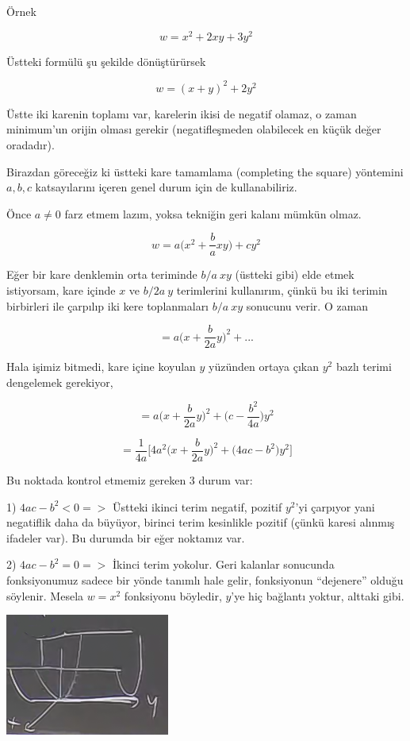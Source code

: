 \documentclass[12pt,fleqn]{article}\usepackage{../../common}
\begin{document}
Örnek

$$ w = x^2 + 2xy + 3y^2 $$

Üstteki formülü şu şekilde dönüştürürsek

$$ w = (x+y)^2 + 2y^2 $$

Üstte iki karenin toplamı var, karelerin ikisi de negatif olamaz, o zaman
minimum'un orijin olması gerekir (negatifleşmeden olabilecek en küçük değer
oradadır). 

Birazdan göreceğiz ki üstteki kare tamamlama (completing the square)
yöntemini $a,b,c$ katsayılarını içeren genel durum için de kullanabiliriz. 

Önce $a \ne 0$ farz etmem lazım, yoksa tekniğin geri kalanı mümkün olmaz. 

$$ w = a \bigg( x^2 + \frac{b}{a} xy \bigg) + cy^2 $$

Eğer bir kare denklemin orta teriminde $b/a \ xy$ (üstteki gibi) elde etmek
istiyorsam, kare içinde $x$ ve $b/2a \ y$ terimlerini kullanırım, çünkü bu iki
terimin birbirleri ile çarpılıp iki kere toplanmaları $b/a \ xy$ sonucunu
verir. O zaman

$$ = a \bigg( x + \frac{b}{2a}y  \bigg)^2  + ... $$

Hala işimiz bitmedi, kare içine koyulan $y$ yüzünden ortaya çıkan $y^2$ bazlı
terimi dengelemek gerekiyor,

$$ = a \bigg( x + \frac{b}{2a}y  \bigg)^2  + 
\bigg( c - \frac{b^2}{4a} \bigg)y^2
$$


$$ = \frac{1}{4a} 
\bigg[
4a^2 \bigg( x+\frac{b}{2a}y \bigg)^2 +
\bigg(4ac - b^2 \bigg)y^2
\bigg]
$$

Bu noktada kontrol etmemiz gereken 3 durum var:

1) $4ac - b^2 < 0 => $ Üstteki ikinci terim negatif, pozitif $y^2$'yi
çarpıyor yani negatiflik daha da büyüyor, birinci terim kesinlikle pozitif
(çünkü karesi alınmış ifadeler var). Bu durumda bir eğer noktamız var. 

2) $4ac - b^2 = 0 => $ İkinci terim yokolur. Geri kalanlar sonucunda
fonksiyonumuz sadece bir yönde tanımlı hale gelir, fonksiyonun ``dejenere''
olduğu söylenir. Mesela $w = x^2$ fonksiyonu böyledir, $y$'ye hiç bağlantı
yoktur, alttaki gibi.

\begin{center}
\includegraphics[height=4cm]{10_2.png}
\end{center}
\end{document}
